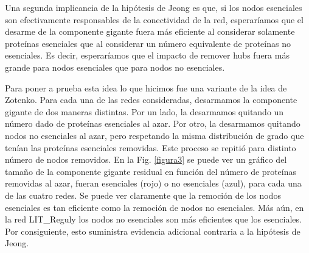 \documentclass[%
 reprint,
 amsmath,amssymb,
 aps,
]{revtex4-1}
\begin{document}
Una segunda implicancia de la hip\'otesis de Jeong es que, si los nodos esenciales son efectivamente responsables de la conectividad de la red, esperar\'iamos que el desarme de la componente gigante fuera m\'as eficiente al considerar solamente prote\'inas esenciales que al considerar un n\'umero equivalente de prote\'inas no esenciales. Es decir, esperar\'iamos que el impacto de remover hubs fuera m\'as grande para nodos esenciales que para nodos no esenciales.

Para poner a prueba esta idea lo que hicimos fue una variante de la idea de Zotenko. Para cada una de las redes consideradas, desarmamos la componente gigante de dos maneras distintas. Por un lado, la desarmamos quitando un n\'umero dado de prote\'inas esenciales al azar. Por otro, la desarmamos quitando nodos no esenciales al azar, pero respetando la misma distribuci\'on de grado que ten\'ian las prote\'inas esenciales removidas. Este proceso se repiti\'o para distinto n\'umero de nodos removidos. En la Fig. \ref{figura3} se puede ver un gr\'afico del tama\~no de la componente gigante residual en funci\'on del n\'umero de prote\'inas removidas al azar, fueran esenciales (rojo) o no esenciales (azul), para cada una de las cuatro redes. Se puede ver claramente que la remoci\'on de los nodos esenciales es tan eficiente como la remoci\'on de nodos no esenciales. M\'as a\'un, en la red LIT\_Reguly los nodos no esenciales son m\'as eficientes que los esenciales. Por consiguiente, esto suministra evidencia adicional contraria a la hip\'otesis de Jeong.
\end{document}
